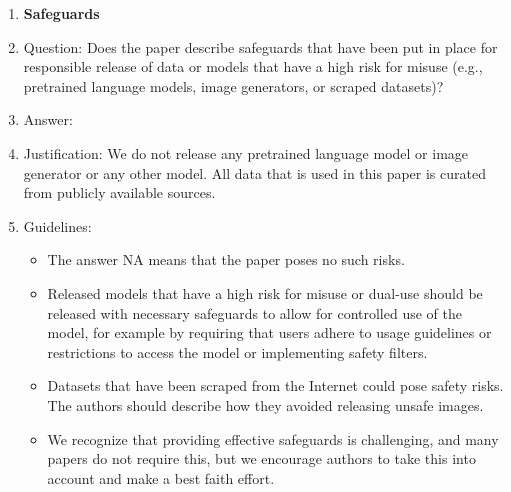 \documentclass{article}
\theoremstyle{plain}
\theoremstyle{definition}
\theoremstyle{remark}
\begin{document}
\begin{enumerate}
\item {\bf Safeguards}
    \item[] Question: Does the paper describe safeguards that have been put in place for responsible release of data or models that have a high risk for misuse (e.g., pretrained language models, image generators, or scraped datasets)?
    \item[] Answer: \answerNA{} %
    \item[] Justification: We do not release any pretrained language model or image generator or any
other model. All data that is used in this paper is curated from publicly available sources.
    \item[] Guidelines:
    \begin{itemize}
        \item The answer NA means that the paper poses no such risks.
        \item Released models that have a high risk for misuse or dual-use should be released with necessary safeguards to allow for controlled use of the model, for example by requiring that users adhere to usage guidelines or restrictions to access the model or implementing safety filters. 
        \item Datasets that have been scraped from the Internet could pose safety risks. The authors should describe how they avoided releasing unsafe images.
        \item We recognize that providing effective safeguards is challenging, and many papers do not require this, but we encourage authors to take this into account and make a best faith effort.
    \end{itemize}


\end{enumerate}
\end{document}
